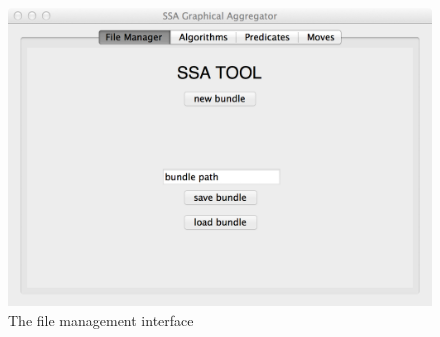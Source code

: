 \begin{figure}
  \centering
  \includegraphics[width=\textwidth]{file-manager}
  \caption{The file management interface}
  \label{fig:iface:fmgr}
\end{figure}

